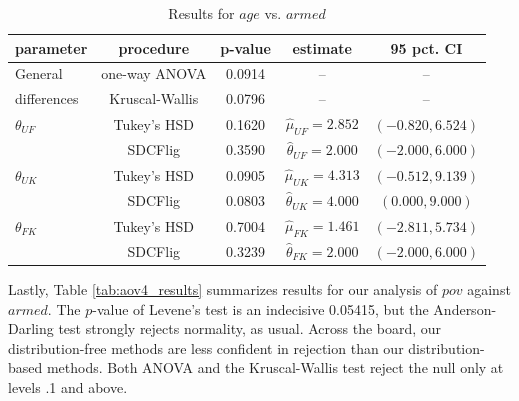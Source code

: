 \vspace{.2in}

\begin{table}[h]
    \centering
    \begin{tabular}{|l|c|c|c|c|}
        \hline
        \textbf{parameter} & \textbf{procedure} & \textbf{p-value} & \textbf{estimate} & \textbf{95 pct. CI}\\
        \hline
        General & one-way ANOVA & 0.0914 & -- & --\\
        differences & Kruscal-Wallis & 0.0796  & -- & --\\
        \hline
        $\theta_{UF}$ & Tukey's HSD & 0.1620 & $\hat{\mu}_{UF} = 2.852$ & $(-0.820, 6.524)$\\
        & SDCFlig & 0.3590 & $\hat{\theta}_{UF} = 2.000$ & $(-2.000, 6.000)$\\
        \hline
        $\theta_{UK}$ & Tukey's HSD & 0.0905 & $\hat{\mu}_{UK} = 4.313$ & $(-0.512, 9.139)$\\
        & SDCFlig & 0.0803 & $\hat{\theta}_{UK} = 4.000$ & $(0.000, 9.000)$\\
        \hline
        $\theta_{FK}$ & Tukey's HSD & 0.7004 & $\hat{\mu}_{FK} = 1.461$ & $(-2.811, 5.734)$\\
        & SDCFlig & 0.3239 & $\hat{\theta}_{FK} = 2.000$ & $(-2.000, 6.000)$\\
        \hline
    \end{tabular}
    \caption{Results for $age$ vs. $armed$}
    \label{tab:aov3_results}
\end{table}

\par Lastly, Table \ref{tab:aov4_results} summarizes results for our analysis of $pov$ against $armed$. The $p$-value of Levene's test is an indecisive 0.05415, but the Anderson-Darling test strongly rejects normality, as usual. Across the board, our distribution-free methods are less confident in rejection than our distribution-based methods. Both ANOVA and the Kruscal-Wallis test reject the null only at levels .1 and above.

